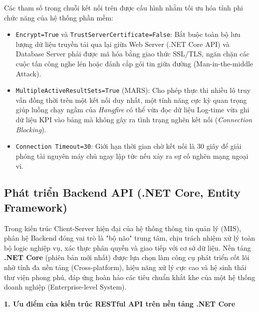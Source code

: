 \documentclass[a4paper,13.5pt]{extreport}
\begin{document}
Các tham số trong chuỗi kết nối trên được cấu hình nhằm tối ưu hóa tính phi chức năng của hệ thống phần mềm:
\begin{itemize}
    \item \texttt{Encrypt=True} và \texttt{TrustServerCertificate=False}: Bắt buộc toàn bộ lưu lượng dữ liệu truyền tải qua lại giữa Web Server (.NET Core API) và Database Server phải được mã hóa bằng giao thức SSL/TLS, ngăn chặn các cuộc tấn công nghe lén hoặc đánh cắp gói tin giữa đường (Man-in-the-middle Attack).
    \item \texttt{MultipleActiveResultSets=True} (MARS): Cho phép thực thi nhiều lô truy vấn đồng thời trên một kết nối duy nhất, một tính năng cực kỳ quan trọng giúp luồng chạy ngầm của \textit{Hangfire} có thể vừa đọc dữ liệu Log-time vừa ghi dữ liệu KPI vào bảng mà không gây ra tình trạng nghẽn kết nối (\textit{Connection Blocking}).
    \item \texttt{Connection Timeout=30}: Giới hạn thời gian chờ kết nối là 30 giây để giải phóng tài nguyên máy chủ ngay lập tức nếu xảy ra sự cố nghẽn mạng ngoại vi.
\end{itemize}

\subsection{Phát triển Backend API (.NET Core, Entity Framework)}

Trong kiến trúc Client-Server hiện đại của hệ thống thông tin quản lý (MIS), phân hệ Backend đóng vai trò là "bộ não" trung tâm, chịu trách nhiệm xử lý toàn bộ logic nghiệp vụ, xác thực phân quyền và giao tiếp với cơ sở dữ liệu. Nền tảng \textbf{.NET Core} (phiên bản mới nhất) được lựa chọn làm công cụ phát triển cốt lõi nhờ tính đa nền tảng (Cross-platform), hiệu năng xử lý cực cao và hệ sinh thái thư viện phong phú, đáp ứng hoàn hảo các tiêu chuẩn khắt khe của một hệ thống doanh nghiệp (Enterprise-level System).

\textbf{1. Ưu điểm của kiến trúc RESTful API trên nền tảng .NET Core}
\end{document}
